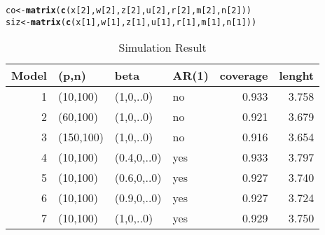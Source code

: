 \documentclass[11pt,oneside, a4paper]{amsart}\usepackage[]{graphicx}\usepackage[]{color}
\makeatletter
\newcommand{\hlnum}[1]{\textcolor[rgb]{0.686,0.059,0.569}{#1}}%
\newcommand{\hlstd}[1]{\textcolor[rgb]{0.345,0.345,0.345}{#1}}%
\newcommand{\hlkwb}[1]{\textcolor[rgb]{0.69,0.353,0.396}{#1}}%
\newcommand{\hlkwd}[1]{\textcolor[rgb]{0.737,0.353,0.396}{\textbf{#1}}}%
\newenvironment{kframe}{%
 \def\at@end@of@kframe{}%
 \ifinner\ifhmode%
  \def\at@end@of@kframe{\end{minipage}}%
  \begin{minipage}{\columnwidth}%
 \fi\fi%
 \def\FrameCommand##1{\hskip\@totalleftmargin \hskip-\fboxsep
 \colorbox{shadecolor}{##1}\hskip-\fboxsep
     \hskip-\linewidth \hskip-\@totalleftmargin \hskip\columnwidth}%
 \MakeFramed {\advance\hsize-\width
   \@totalleftmargin\z@ \linewidth\hsize
   \@setminipage}}%
 {\par\unskip\endMakeFramed%
 \at@end@of@kframe}
\newenvironment{knitrout}{}{} %
\makeatother
\begin{document}
\begin{knitrout}
\color{fgcolor}\begin{kframe}
\begin{alltt}
\hlstd{co}\hlkwb{<-}\hlkwd{matrix}\hlstd{(}\hlkwd{c}\hlstd{(x[}\hlnum{2}\hlstd{],w[}\hlnum{2}\hlstd{],z[}\hlnum{2}\hlstd{],u[}\hlnum{2}\hlstd{],r[}\hlnum{2}\hlstd{],m[}\hlnum{2}\hlstd{],n[}\hlnum{2}\hlstd{]))}
\hlstd{siz}\hlkwb{<-}\hlkwd{matrix}\hlstd{(}\hlkwd{c}\hlstd{(x[}\hlnum{1}\hlstd{],w[}\hlnum{1}\hlstd{],z[}\hlnum{1}\hlstd{],u[}\hlnum{1}\hlstd{],r[}\hlnum{1}\hlstd{],m[}\hlnum{1}\hlstd{],n[}\hlnum{1}\hlstd{]))}
\end{alltt}
\end{kframe}
\end{knitrout}



\begin{table}[ht]
\centering
\caption{Simulation Result} 
\label{Test_table}
{\footnotesize
\begin{tabular}{rlllrr}
  \toprule 
 Model & (p,n) & beta & AR(1) & coverage & lenght \\
 \midrule 
    1 & (10,100) & (1,0,..0) & no & 0.933 & 3.758 \\ 
     2 & (60,100) & (1,0,..0) & no & 0.921 & 3.679 \\ 
     3 & (150,100) & (1,0,..0) & no & 0.916 & 3.654 \\ 
     4 & (10,100) & (0.4,0,..0) & yes & 0.933 & 3.797 \\ 
     5 & (10,100) & (0.6,0,..0) & yes & 0.927 & 3.740 \\ 
     6 & (10,100) & (0.9,0,..0) & yes & 0.927 & 3.724 \\ 
     7 & (10,100) & (1,0,..0) & yes & 0.929 & 3.750 \\ 
   \bottomrule 
\end{tabular}
}
\end{table}
\end{document}
